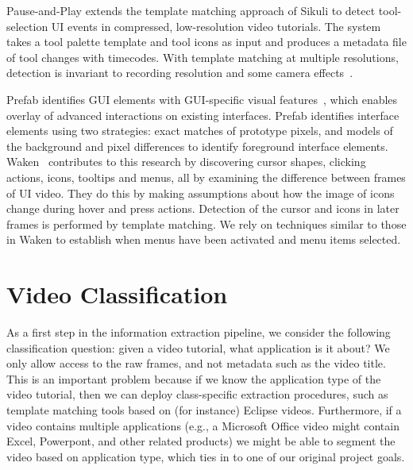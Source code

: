 \documentclass[10pt]{article}
\begin{document}
Pause-and-Play extends the template matching approach of Sikuli to detect tool-selection UI events
in compressed, low-resolution video tutorials.  The system takes a tool palette template and tool
icons as input and produces a metadata file of tool changes with timecodes.  With template matching
at multiple resolutions, detection is invariant to recording resolution and some camera
effects~\cite{pongnumkul_pause-and-play_2011}.

Prefab identifies GUI elements with GUI-specific visual features~\cite{dixon_prefab_2010}, which
enables overlay of advanced interactions on existing interfaces.  Prefab identifies interface
elements using two strategies: exact matches of prototype pixels, and models of the background and
pixel differences to identify foreground interface elements. Waken~\cite{banovic_waken_2012}
contributes to this research by discovering cursor shapes, clicking actions, icons, tooltips and
menus, all by examining the difference between frames of UI video.  They do this by making
assumptions about how the image of icons change during hover and press actions.  Detection of the
cursor and icons in later frames is performed by template matching.  We rely on techniques similar
to those in Waken to establish when menus have been activated and menu items selected.


\section{Video Classification}\label{sec:daniel}

As a first step in the information extraction pipeline, we consider the following classification
question: given a video tutorial, what application is it about? We only allow access to the raw
frames, and not metadata such as the video title.  This is an important problem because if we know
the application type of the video tutorial, then we can deploy class-specific extraction procedures,
such as template matching tools based on (for instance) Eclipse videos. Furthermore, if a video
contains multiple applications (e.g., a Microsoft Office video might contain Excel, Powerpont, and
other related products) we might be able to segment the video based on application type, which ties
in to one of our original project goals.
\end{document}

